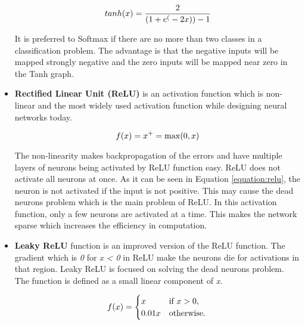 \begin{itemize}
                    \begin{equation}
                        tanh(x) = \frac{2}{(1+e^(-2x)) -1} \label{equation:tanh} \\
                    \end{equation}

                    It is preferred to Softmax if there are no more than two classes in a classification problem.
                    The advantage is that the negative inputs will be mapped strongly negative and the zero inputs will be mapped near zero in the Tanh graph.

            \item \textbf{Rectified Linear Unit (ReLU)} is an activation function which is non-linear and the most widely used activation function while designing neural networks today.

                    \begin{equation}
                          f(x) = x^+ = \max(0, x) \label{equation:relu} \\
                    \end{equation}

                    The non-linearity makes backpropagation of the errors and have multiple layers of neurons being activated by ReLU function easy.
                    ReLU does not activate all neurons at once.
                    As it can be seen in Equation \eqref{equation:relu}, the neuron is not activated if the input is not positive.
                    This may cause the dead neurons problem which is the main problem of ReLU.
                    In this activation function, only a few neurons are activated at a time.
                    This makes the network sparse which increases the efficiency in computation.

            \item \textbf{Leaky ReLU} function is an improved version of the ReLU function.
                    The gradient which is \emph{0} for \emph{x < 0} in ReLU make the neurons die for activations in that region.
                    Leaky ReLU is focused on solving the dead neurons problem.
                    The function is defined as a small linear component of \emph{x}.

                    \begin{equation}
                         f(x) = \begin{cases} x &
                            \text{if } x > 0, \\
                            0.01x & \text{otherwise}.
                         \end{cases}\\
                    \end{equation}


\end{itemize}
